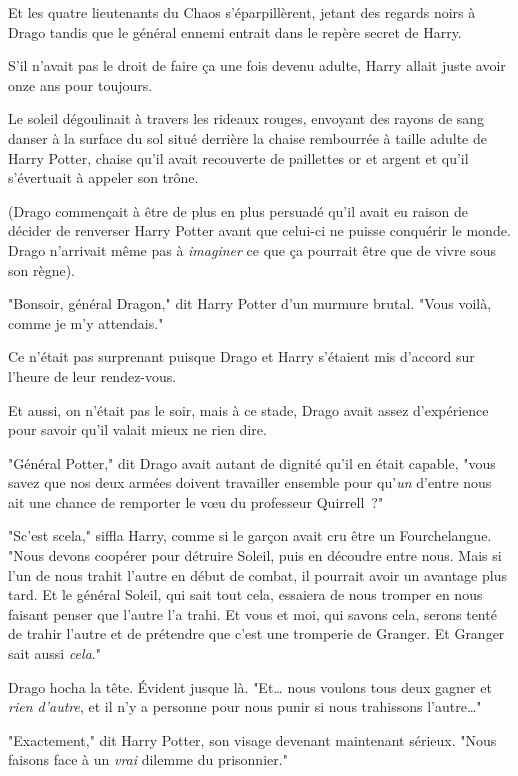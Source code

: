 Et les quatre lieutenants du Chaos s'éparpillèrent, jetant des regards noirs à Drago tandis que le général ennemi entrait dans le repère secret de Harry.

S'il n'avait pas le droit de faire ça une fois devenu adulte, Harry allait juste avoir onze ans pour toujours.

\later

Le soleil dégoulinait à travers les rideaux rouges, envoyant des rayons de sang danser à la surface du sol situé derrière la chaise rembourrée à taille adulte de Harry Potter, chaise qu'il avait recouverte de paillettes or et argent et qu'il s'évertuait à appeler son trône.

(Drago commençait à être de plus en plus persuadé qu'il avait eu raison de décider de renverser Harry Potter avant que celui-ci ne puisse conquérir le monde. Drago n'arrivait même pas à \emph{imaginer} ce que ça pourrait être que de vivre sous son règne).

"Bonsoir, général Dragon," dit Harry Potter d'un murmure brutal. "Vous voilà, comme je m'y attendais."

Ce n'était pas surprenant puisque Drago et Harry s'étaient mis d'accord sur l'heure de leur rendez-vous.

Et aussi, on n'était pas le soir, mais à ce stade, Drago avait assez d'expérience pour savoir qu'il valait mieux ne rien dire.

"Général Potter," dit Drago avait autant de dignité qu'il en était capable, "vous savez que nos deux armées doivent travailler ensemble pour qu'\emph{un} d'entre nous ait une chance de remporter le vœu du professeur Quirrell~?"

"Sc'est scela," siffla Harry, comme si le garçon avait cru être un Fourchelangue. "Nous devons coopérer pour détruire Soleil, puis en découdre entre nous. Mais si l'un de nous trahit l'autre en début de combat, il pourrait avoir un avantage plus tard. Et le général Soleil, qui sait tout cela, essaiera de nous tromper en nous faisant penser que l'autre l'a trahi. Et vous et moi, qui savons cela, serons tenté de trahir l'autre et de prétendre que c'est une tromperie de Granger. Et Granger sait aussi \emph{cela}."

Drago hocha la tête. Évident jusque là. "Et… nous voulons tous deux gagner et \emph{rien d'autre}, et il n'y a personne pour nous punir si nous trahissons l'autre…"

"Exactement," dit Harry Potter, son visage devenant maintenant sérieux. "Nous faisons face à un \emph{vrai} dilemme du prisonnier."

